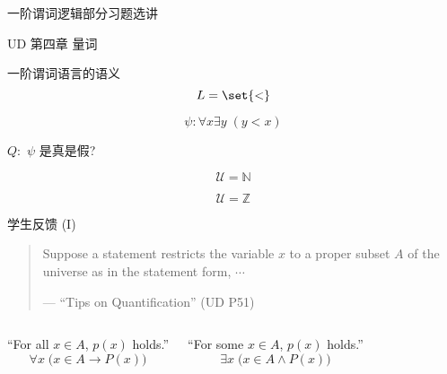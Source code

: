 \begin{frame}{}
  \centerline{\LARGE 一阶谓词逻辑部分习题选讲}
  \vspace{0.50cm}
  \centerline{\large UD 第四章 \; 量词}
\end{frame}

\begin{frame}{一阶谓词语言的语义}
  \[
    L = \set{<}
  \]

  \[
    \psi: \forall x \exists y \; (y < x)
  \]

  \vspace{0.30cm}
  \centerline{$Q:$ $\psi$ 是真是假?}

  \vspace{0.50cm}
  \pause
  \[
    \mathcal{U} = \mathbb{N}
  \]

  \[
    \mathcal{U} = \mathbb{Z}
  \]
\end{frame}

\begin{frame}{学生反馈 (I)}
  \begin{quote}
    Suppose a statement restricts the variable $x$ to a proper subset $A$
    of the universe as in the statement form, $\cdots$

    \hfill --- ``Tips on Quantification'' (UD P51)
  \end{quote}
  
  \vspace{0.60cm}
  \begin{columns}
      ``For all $x \in A$, $p(x)$ holds.''
      \[
	\forall x \; \Big(x \in A \to P(x)\Big)
      \]

      ``For some $x \in A$, $p(x)$ holds.''
      \[
	\exists x \; \Big(x \in A \land P(x)\Big)
      \]

  \end{columns}

  \vspace{0.30cm}
  \centerline{}
\end{frame}

